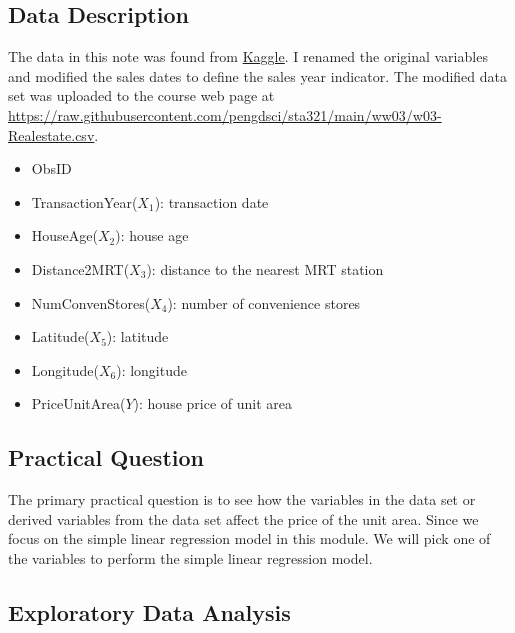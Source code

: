 \documentclass[
]{book}
\providecommand{\tightlist}{%
  \setlength{\itemsep}{0pt}\setlength{\parskip}{0pt}}
\begin{document}
\hypertarget{data-description}{%
\subsection{Data Description}\label{data-description}}

The data in this note was found from \href{https://www.kaggle.com/}{Kaggle}. I renamed the original variables and modified the sales dates to define the sales year indicator. The modified data set was uploaded to the course web page at \url{https://raw.githubusercontent.com/pengdsci/sta321/main/ww03/w03-Realestate.csv}.

\begin{itemize}
\tightlist
\item
  ObsID
\item
  TransactionYear(\(X_1\)): transaction date\\
\item
  HouseAge(\(X_2\)): house age\\
\item
  Distance2MRT(\(X_3\)): distance to the nearest MRT station\\
\item
  NumConvenStores(\(X_4\)): number of convenience stores\\
\item
  Latitude(\(X_5\)): latitude
\item
  Longitude(\(X_6\)): longitude\\
\item
  PriceUnitArea(\(Y\)): house price of unit area
\end{itemize}

\hypertarget{practical-question}{%
\subsection{Practical Question}\label{practical-question}}

The primary practical question is to see how the variables in the data set or derived variables from the data set affect the price of the unit area. Since we focus on the simple linear regression model in this module. We will pick one of the variables to perform the simple linear regression model.

\hypertarget{exploratory-data-analysis}{%
\subsection{Exploratory Data Analysis}\label{exploratory-data-analysis}}
\end{document}
